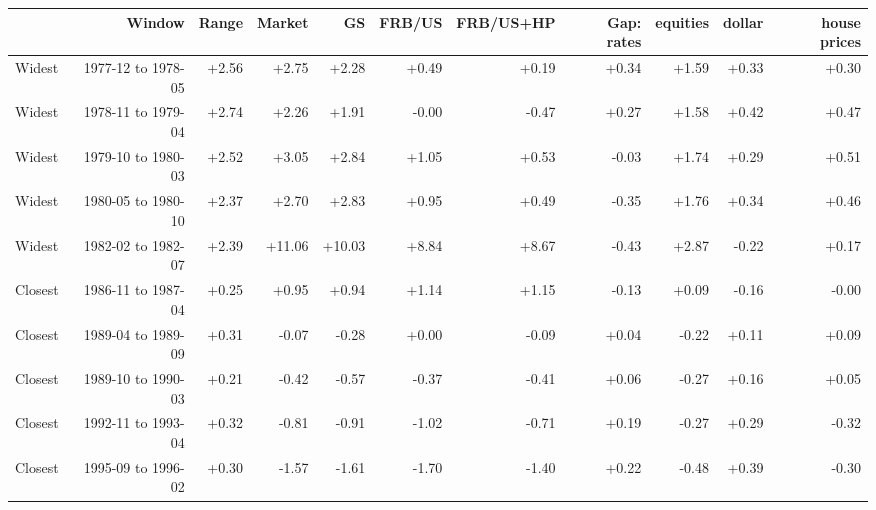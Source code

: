 \begin{tabular}{lrrrrrrrrrr}
\toprule
 & Window & Range & Market & GS & FRB/US & FRB/US+HP & Gap: rates & equities & dollar & house prices \\
\midrule
Widest & 1977-12 to 1978-05 & +2.56 & +2.75 & +2.28 & +0.49 & +0.19 & +0.34 & +1.59 & +0.33 & +0.30 \\
Widest & 1978-11 to 1979-04 & +2.74 & +2.26 & +1.91 & -0.00 & -0.47 & +0.27 & +1.58 & +0.42 & +0.47 \\
Widest & 1979-10 to 1980-03 & +2.52 & +3.05 & +2.84 & +1.05 & +0.53 & -0.03 & +1.74 & +0.29 & +0.51 \\
Widest & 1980-05 to 1980-10 & +2.37 & +2.70 & +2.83 & +0.95 & +0.49 & -0.35 & +1.76 & +0.34 & +0.46 \\
Widest & 1982-02 to 1982-07 & +2.39 & +11.06 & +10.03 & +8.84 & +8.67 & -0.43 & +2.87 & -0.22 & +0.17 \\
Closest & 1986-11 to 1987-04 & +0.25 & +0.95 & +0.94 & +1.14 & +1.15 & -0.13 & +0.09 & -0.16 & -0.00 \\
Closest & 1989-04 to 1989-09 & +0.31 & -0.07 & -0.28 & +0.00 & -0.09 & +0.04 & -0.22 & +0.11 & +0.09 \\
Closest & 1989-10 to 1990-03 & +0.21 & -0.42 & -0.57 & -0.37 & -0.41 & +0.06 & -0.27 & +0.16 & +0.05 \\
Closest & 1992-11 to 1993-04 & +0.32 & -0.81 & -0.91 & -1.02 & -0.71 & +0.19 & -0.27 & +0.29 & -0.32 \\
Closest & 1995-09 to 1996-02 & +0.30 & -1.57 & -1.61 & -1.70 & -1.40 & +0.22 & -0.48 & +0.39 & -0.30 \\
\bottomrule
\end{tabular}
